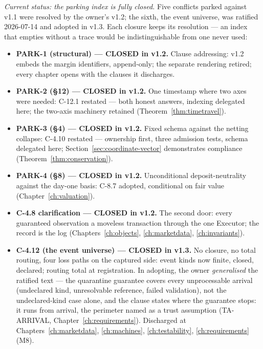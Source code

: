 \documentclass[11pt,a4paper]{article}
\begin{document}
\emph{Current status: the parking index is fully closed.} Five conflicts parked against
v1.1 were resolved by the owner's v1.2; the sixth, the event universe, was ratified
2026-07-14 and adopted in v1.3. Each closure keeps its resolution --- an index that empties
without a trace would be indistinguishable from one never used:

\begin{itemize}
\item \textbf{PARK-1 (structural) --- CLOSED in v1.2.} Clause addressing: v1.2 embeds the
  margin identifiers, append-only; the separate rendering retired; every chapter opens with
  the clauses it discharges.
\item \textbf{PARK-2 (\S12) --- CLOSED in v1.2.} One timestamp where two axes were needed:
  C-12.1 restated --- both honest answers, indexing delegated here; the two-axis machinery
  retained (Theorem~\ref{thm:timetravel}).
\item \textbf{PARK-3 (\S4) --- CLOSED in v1.2.} Fixed schema against the netting collapse:
  C-4.10 restated --- ownership first, three admission tests, schema delegated here;
  Section~\ref{sec:coordinate-vector} demonstrates compliance
  (Theorem~\ref{thm:conservation}).
\item \textbf{PARK-4 (\S8) --- CLOSED in v1.2.} Unconditional deposit-neutrality against
  the day-one basis: C-8.7 adopted, conditional on fair value (Chapter~\ref{ch:valuation}).
\item \textbf{C-4.8 clarification --- CLOSED in v1.2.} The second door: every guaranteed
  observation a moveless transaction through the one Executor; the record is the log
  (Chapters~\ref{ch:objects}, \ref{ch:marketdata}, \ref{ch:invariants}).
\item \textbf{C-4.12 (the event universe) --- CLOSED in v1.3.} No closure, no total
  routing, four loss paths on the captured side: event kinds now finite, closed, declared;
  routing total at registration. In adopting, the owner \emph{generalised} the ratified
  text --- the quarantine guarantee covers every unprocessable arrival (undeclared kind,
  unresolvable reference, failed validation), not the undeclared-kind case alone, and the
  clause states where the guarantee stops: it runs from arrival, the perimeter named as a
  trust assumption (TA-ARRIVAL, Chapter~\ref{ch:requirements}). Discharged at
  Chapters~\ref{ch:marketdata}, \ref{ch:machines}, \ref{ch:testability},
  \ref{ch:requirements} (M8).
\end{itemize}
\end{document}
